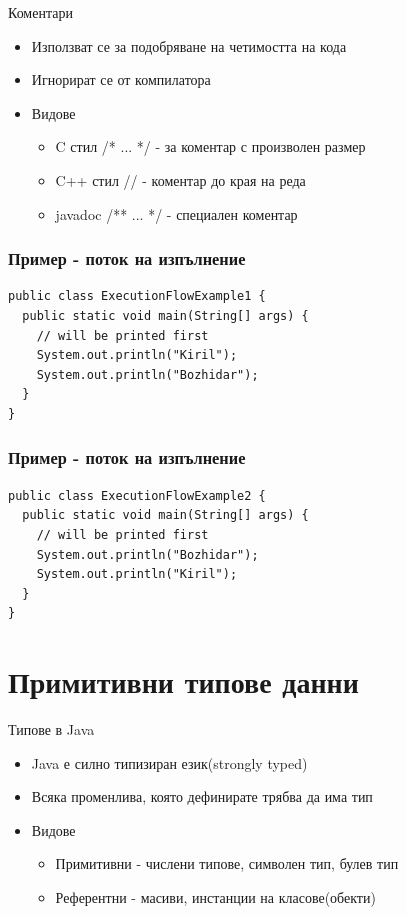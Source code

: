 \documentclass{beamer}
\begin{document}
\begin{frame}{Коментари}
  \transdissolve  
  \begin{itemize}
    \item Използват се за подобряване на четимостта на кода
    \item Игнорират се от компилатора
    \item Видове
      \begin{itemize}
        \item C стил /* ... */ - за коментар с произволен размер
        \item C++ стил // - коментар до края на реда
        \item javadoc /** ... */ - специален коментар
      \end{itemize}
  \end{itemize}
\end{frame}

\begin{frame}[fragile]
  \frametitle{Пример - поток на изпълнение}
  \transdissolve
  \begin{lstlisting}
public class ExecutionFlowExample1 {
  public static void main(String[] args) {
    // will be printed first
    System.out.println("Kiril");
    System.out.println("Bozhidar");
  }
}
  \end{lstlisting}
\end{frame}

\begin{frame}[fragile]
  \frametitle{Пример - поток на изпълнение}
  \transdissolve
  \begin{lstlisting}
public class ExecutionFlowExample2 {
  public static void main(String[] args) {
    // will be printed first
    System.out.println("Bozhidar");
    System.out.println("Kiril");
  }
}
  \end{lstlisting}
\end{frame}

\section{Примитивни типове данни}

\begin{frame}{Типове в Java}
  
  \begin{itemize}
  \item Java е силно типизиран език(strongly typed)
  \item Всяка променлива, която дефинирате трябва да има тип
  \item Видове
    \begin{itemize}
      \item Примитивни - числени типове, символен тип, булев тип
      \item Референтни - масиви, инстанции на класове(обекти)
    \end{itemize}
  \end{itemize}
\end{frame}
\end{document}
